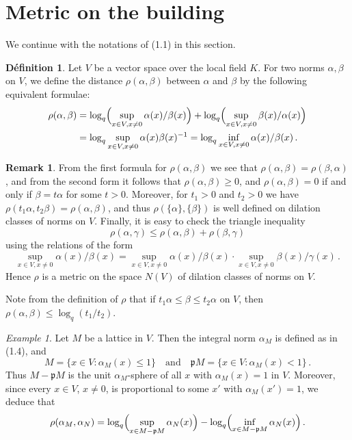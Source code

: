 \documentclass[12pt,a4paper]{article}
\theoremstyle{plain}
\theoremstyle{definition}
\newtheorem{definition}{D\'efinition}[section]
\newtheorem{remark}{Remark}[section]
\theoremstyle{remark}
\newtheorem{example}{Example}[section]
\begin{document}
\section{Metric on the building}

We continue with the notations of (1.1) in this section.

\begin{definition}
Let $V$ be a vector space over the local field $K$. For two norms 
$\alpha, \beta$ on $V$, we define the distance $\rho(\alpha,\beta)$ between 
$\alpha$ and $\beta$ by the following equivalent formulae:
\begin{align*}
\rho(\alpha,\beta) &= \log_q\Bigl(\sup_{x \in V, x \neq 0} \alpha(x)/\beta(x)\Bigr) + \log_q\Bigl(\sup_{x \in V, x \neq 0} \beta(x)/\alpha(x)\Bigr) \\
&= \log_q\sup_{x \in V, x \neq 0} \alpha(x)\beta(x)^{-1} = \log_q \inf_{x \in V, x \neq 0} \alpha(x)/\beta(x) \,.
\end{align*}
\end{definition}

\begin{remark}
From the first formula for $\rho(\alpha,\beta)$ we see that 
$\rho(\alpha,\beta) = \rho(\beta,\alpha)$, and from the second form it follows 
that $\rho(\alpha,\beta) \geqslant 0$, and $\rho(\alpha,\beta) = 0$ if and only if 
$\beta = t\alpha$ for some $t > 0$. Moreover, for $t_1 > 0$ and $t_2 > 0$ we 
have $\rho(t_1\alpha, t_2\beta) = \rho(\alpha,\beta)$, and thus 
$\rho(\{\alpha\}, \{\beta\})$ is well defined on dilation classes of norms on 
$V$. Finally, it is easy to check the triangle inequality
\[
\rho(\alpha,\gamma) \leqslant \rho(\alpha,\beta) + \rho(\beta,\gamma)
\]
using the relations of the form
\[
\sup_{x \in V, x \neq 0} \alpha(x)/\beta(x) = \sup_{x \in V, x \neq 0} \alpha(x)/\beta(x) \cdot \sup_{x \in V, x \neq 0} \beta(x)/\gamma(x) \,.
\]
Hence $\rho$ is a metric on the space $N(V)$ of dilation classes of norms on 
$V$.

Note from the definition of $\rho$ that if $t_1\alpha \leqslant \beta \leqslant t_2\alpha$ 
on $V$, then $\rho(\alpha,\beta) \leqslant \log_q(t_1/t_2)$.
\end{remark}

\begin{example}
Let $M$ be a lattice in $V$. Then the integral norm $\alpha_M$ is defined as 
in (1.4), and
\[
M = \{x \in V : \alpha_M(x) \leqslant 1\} \quad\text{and}\quad \mathfrak{p}M = \{x \in V : \alpha_M(x) < 1\} \,.
\]
Thus $M - \mathfrak{p}M$ is the unit $\alpha_M$-sphere of all $x$ with 
$\alpha_M(x) = 1$ in $V$. Moreover, since every $x \in V$, $x \neq 0$, is 
proportional to some $x'$ with $\alpha_M(x') = 1$, we deduce that
\[
\rho(\alpha_M, \alpha_N) = \log_q\Bigl(\sup_{x \in M-\mathfrak{p}M} \alpha_N(x)\Bigr) - \log_q\Bigl(\inf_{x \in M-\mathfrak{p}M} \alpha_N(x)\Bigr) \,.
\]
\end{example}
\end{document}
